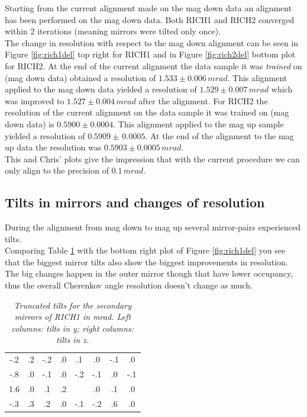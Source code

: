 Starting from the current alignment made on the mag down data an alignment has been performed on the mag down data. Both RICH1 and RICH2 converged within 2 iterations (meaning mirrors were tilted only once).\\
The change in resolution with respect to the mag down alignment can be seen in Figure \ref{fig:rich1del} top right for RICH1 and in Figure \ref{fig:rich2del} bottom plot for RICH2. At the end of the current alignment the data sample it was \textit{trained} on (mag down data) obtained a resolution of $1.533 \pm 0.006\, mrad$. This alignment applied to the mag down data yielded a resolution of $1.529 \pm 0.007\, mrad$ which was improved to $1.527 \pm 0.004\, mrad$ after the alignment. For RICH2 the resolution of the current alignment on the data sample it was trained on (mag down data) is $0.5900 \pm 0.0004$. This alignment applied to the mag up sample yielded a resolution of $0.5909 \pm \, 0.0005$. At the end of the alignment to the mag up data the resolution was $0.5903 \pm 0.0005 \, mrad$. \\
This and Chris' plots give the impression that with the current procedure we can only align to the precision of $0.1 \, mrad$.\\

\subsection{Tilts in mirrors and changes of resolution}
During the alignment from mag down to mag up several mirror-pairs experienced tilts. \\
Comparing Table \ref{tab:rich1} with the bottom right plot of Figure \ref{fig:rich1del} you see that the biggest mirror tilts also show the biggest improvements in resolution. The big changes happen in the outer mirror though that have lower occupancy, thus the overall Cherenkov angle resolution doesn't change as much.\\

\begin{table}[!h]
	\begin{center}
		\begin{tabular}{c|c|c|c|c|c|c|c}
               -.2  &  .2  & -.2  &  .0  & \qquad   .1  &  .0  & -.1  &  .0 \\
               -.8  &  .0  & -.1  &  .0  & \qquad   -.2 &  -.1 &   .0 &  -.1 \\
               1.6  &  .0  &  .1  &  .2  &  \qquad 1.1  &  .0  &  .1  &  .0 \\
               -.3  &  .3  &  .2  &  .0 &   \qquad -.1  & -.2  &  .6  &  .0 \\
\end{tabular}
\end{center}
\caption{\textit{Truncated tilts for the secondary mirrors of RICH1 in mrad. Left columns: tilts in y; right columns: tilts in z. }}
\label{tab:rich1}
\end{table}

